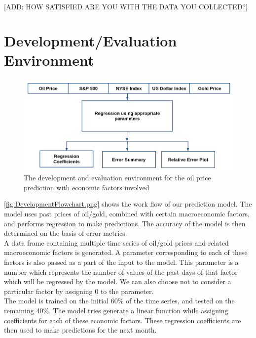 \documentclass[runningheads]{llncs}
\begin{document}
[ADD: HOW SATISFIED ARE YOU WITH THE DATA YOU COLLECTED?]

\newpage
\section{Development/Evaluation Environment}

\begin{figure}
\centering
\includegraphics[width=\textwidth]{DevelopmentFlowchart.png}
\caption{The development and evaluation environment for the oil price prediction with economic factors involved}
\label{fig:DevelopmentFlowchart.png}
\end{figure}

\noindent \autoref{fig:DevelopmentFlowchart.png} shows the work flow of our prediction model. The model uses past prices of oil/gold, combined with certain macroeconomic factors, and performs regression to make predictions. The accuracy of the model is then determined on the basis of error metrics. \\

\noindent A data frame containing multiple time series of oil/gold prices and related macroeconomic factors is generated. A parameter corresponding to each of these factors is also passed as a part of the input to the model. This parameter is a number which represents the number of values of the past days of that factor which will be regressed by the model. We can also choose not to consider a particular factor by assigning $0$ to the parameter.\\

\noindent The model is trained on the initial 60\% of the time series, and tested on the remaining 40\%. The model tries generate a linear function while assigning coefficients for each of these economic factors. These regression coefficients are then used to make predictions for the next month. \\  
\end{document}
